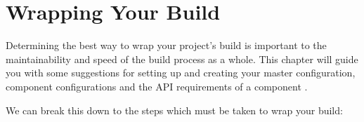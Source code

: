 %
%
%
%
\chapter{Wrapping Your Build}\label{chap:wrapping}

Determining the best way to wrap your project's build is important to
the maintainability and speed of the build process as a whole.  This
chapter will guide you with some suggestions for setting up and
creating your master configuration, component configurations and the
API requirements of a component \makefile.

We can break this down to the steps which must be taken to wrap your
build:

